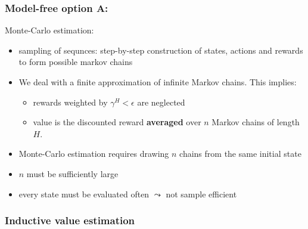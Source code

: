 \begin{frame}\frametitle{Model-free option A:~\subsecname}

Monte-Carlo estimation:

	\begin{itemize}
		\item sampling of sequnces: step-by-step construction of states, actions and rewards to form possible markov chains
		\item We deal with a finite approximation of infinite Markov chains. This implies:
			\begin{itemize}
				\item rewards weighted by $\gamma^H < \epsilon$ are neglected
				\item value is the discounted reward \textbf{averaged} over $n$ Markov chains of length $H$. 
			\end{itemize}
		
		
		\pause 
		
		\item Monte-Carlo estimation requires drawing $n$ chains 
			from the same initial state %
		\item $n$ must be sufficiently large
		\item every state must be evaluated often 
			$\leadsto$ not sample efficient
	\end{itemize}
	
\end{frame}

\subsubsection{Inductive value estimation}

